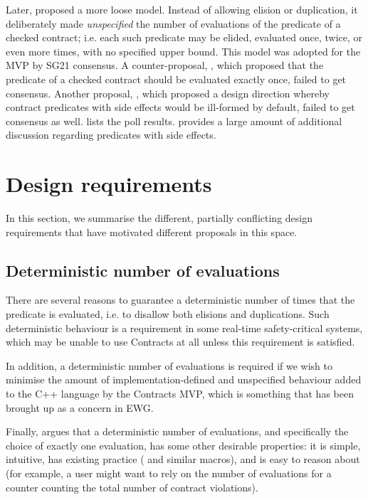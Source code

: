 Later, \cite{P2751R1} proposed a more loose model. Instead of allowing elision or duplication, it deliberately made \emph{unspecified} the number of evaluations of the predicate of a checked contract; i.e. each such predicate may be elided, evaluated once, twice, or even more times, with no specified upper bound. This model was adopted for the MVP by SG21 consensus. A counter-proposal, \cite{P2756R0}, which proposed that the predicate of a checked contract should be evaluated exactly once, failed to get consensus. Another proposal, \cite{P2680R1}, which proposed a design direction whereby contract predicates with side effects would be ill-formed by default, failed to get consensus as well. \cite{P2751R1} lists the poll results. \cite{P2570R2} provides a large amount of additional discussion regarding predicates with side effects.


\section{Design requirements}
\label{sec:reqs}

In this section, we summarise the different, partially conflicting design requirements that have motivated different proposals in this space.

\subsection{Deterministic number of evaluations}
\label{subsec:determ}

There are several reasons to guarantee a deterministic number of times that the predicate is evaluated, i.e. to disallow both elisions and duplications. Such deterministic behaviour is a requirement in some real-time safety-critical systems, which may be unable to use Contracts at all unless this requirement is satisfied.

In addition, a deterministic number of evaluations is required if we wish to minimise the amount of implementation-defined and unspecified behaviour added to the C++ language by the Contracts MVP, which is something that has been brought up as a concern in EWG.

Finally, \cite{P2756R0} argues that a deterministic number of evaluations, and specifically the choice of exactly one evaluation, has some other desirable properties: it is simple, intuitive, has existing practice ( and similar macros), and is easy to reason about (for example, a user might want to rely on the number of evaluations for a counter counting the total number of contract violations).

